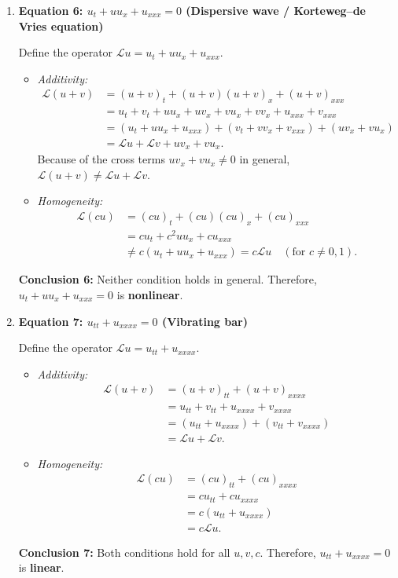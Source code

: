 \documentclass[11pt,a4paper]{article}
\begin{document}
\begin{enumerate}[label=\textbf{\arabic*.}]
    \item \textbf{Equation 6: $u_t + u u_x + u_{xxx} = 0$ (Dispersive wave / Korteweg--de Vries equation)}
    
    Define the operator $\mathcal{L}u = u_t + u u_x + u_{xxx}$.
    \begin{itemize}
        \item \emph{Additivity:}
        \begin{align*}
            \mathcal{L}(u + v) &= (u + v)_t + (u + v)(u + v)_x + (u + v)_{xxx} \\
            &= u_t + v_t + u u_x + u v_x + v u_x + v v_x + u_{xxx} + v_{xxx} \\
            &= (u_t + u u_x + u_{xxx}) + (v_t + v v_x + v_{xxx}) + (u v_x + v u_x) \\
            &= \mathcal{L}u + \mathcal{L}v + u v_x + v u_x.
        \end{align*}
        Because of the cross terms $u v_x + v u_x \neq 0$ in general, $\mathcal{L}(u + v) \neq \mathcal{L}u + \mathcal{L}v$.
        \item \emph{Homogeneity:}
        \begin{align*}
            \mathcal{L}(cu) &= (cu)_t + (cu)(cu)_x + (cu)_{xxx} \\
            &= c u_t + c^2 u u_x + c u_{xxx} \\
            &\neq c(u_t + u u_x + u_{xxx}) = c\mathcal{L}u \quad (\text{for } c \neq 0, 1).
        \end{align*}
    \end{itemize}
    \textbf{Conclusion 6:} Neither condition holds in general. Therefore, $u_t + u u_x + u_{xxx} = 0$ is \textbf{nonlinear}.

    \item \textbf{Equation 7: $u_{tt} + u_{xxxx} = 0$ (Vibrating bar)}
    
    Define the operator $\mathcal{L}u = u_{tt} + u_{xxxx}$.
    \begin{itemize}
        \item \emph{Additivity:}
        \begin{align*}
            \mathcal{L}(u + v) &= (u + v)_{tt} + (u + v)_{xxxx} \\
            &= u_{tt} + v_{tt} + u_{xxxx} + v_{xxxx} \\
            &= (u_{tt} + u_{xxxx}) + (v_{tt} + v_{xxxx}) \\
            &= \mathcal{L}u + \mathcal{L}v.
        \end{align*}
        \item \emph{Homogeneity:}
        \begin{align*}
            \mathcal{L}(cu) &= (cu)_{tt} + (cu)_{xxxx} \\
            &= c u_{tt} + c u_{xxxx} \\
            &= c(u_{tt} + u_{xxxx}) \\
            &= c\mathcal{L}u.
        \end{align*}
    \end{itemize}
    \textbf{Conclusion 7:} Both conditions hold for all $u, v, c$. Therefore, $u_{tt} + u_{xxxx} = 0$ is \textbf{linear}.


\end{enumerate}
\end{document}
